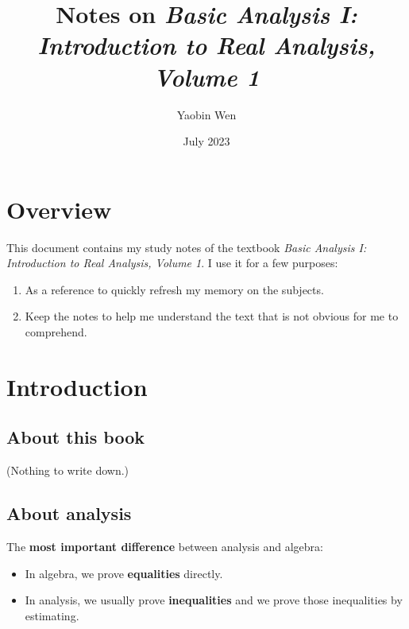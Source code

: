 \documentclass[12pt, letterpaper, oneside]{book}
\title{
  Notes on \textit{Basic Analysis I: Introduction to Real Analysis, Volume 1}
}
\author{Yaobin Wen}
\date{July 2023}
\begin{document}
\maketitle
\tableofcontents

\chapter*{Overview}

This document contains my study notes of the textbook \textit{Basic Analysis I:
Introduction to Real Analysis, Volume 1}. I use it for a few purposes:

\begin{enumerate}
  \item As a reference to quickly refresh my memory on the subjects.
  \item Keep the notes to help me understand the text that is not obvious for
    me to comprehend.
\end{enumerate}

%
%

\chapter*{Introduction}

\section{About this book}

(Nothing to write down.)

\section{About analysis}

The \textbf{most important difference} between analysis and algebra:
\begin{itemize}
  \item In algebra, we prove \textbf{equalities} directly.
  \item In analysis, we usually prove \textbf{inequalities} and we prove those
    inequalities by estimating.
\end{itemize}
\end{document}
